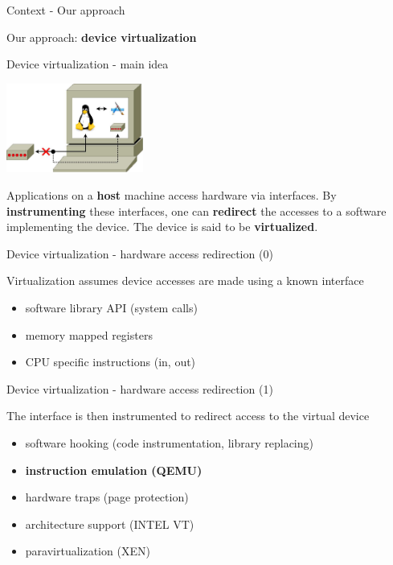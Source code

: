 \documentclass{beamer}
\begin{document}
\begin{frame}{Context - Our approach}
  \begin{center} Our approach: \textbf{device virtualization} \end{center}
\end{frame}

\begin{frame}{Device virtualization - main idea}
  \begin{center}
    \includegraphics[width=45mm]{pic/dv_redirect/main.jpeg}
  \end{center}
  \begin{small}
    Applications on a \textbf{host} machine access hardware via interfaces. By
    \textbf{instrumenting} these interfaces, one can \textbf{redirect} the accesses
    to a software implementing the device. The device is said to be
    \textbf{virtualized}.
  \end{small}
\end{frame}

\begin{frame}{Device virtualization - hardware access redirection (0)}
  \begin{small}
  Virtualization assumes device accesses are made using a known interface
  \begin{itemize}
  \item software library API (system calls)
  \item memory mapped registers
  \item CPU specific instructions (in, out)
  \end{itemize}
  \end{small}
\end{frame}

\begin{frame}{Device virtualization - hardware access redirection (1)}
  \begin{small}
  The interface is then instrumented to redirect access to the virtual device
  \begin{itemize}
  \item software hooking (code instrumentation, library replacing)
  \item \textbf{instruction emulation (QEMU)}
  \item hardware traps (page protection)
  \item architecture support (INTEL VT)
  \item paravirtualization (XEN)
  \end{itemize}
  \end{small}
\end{frame}
\end{document}
